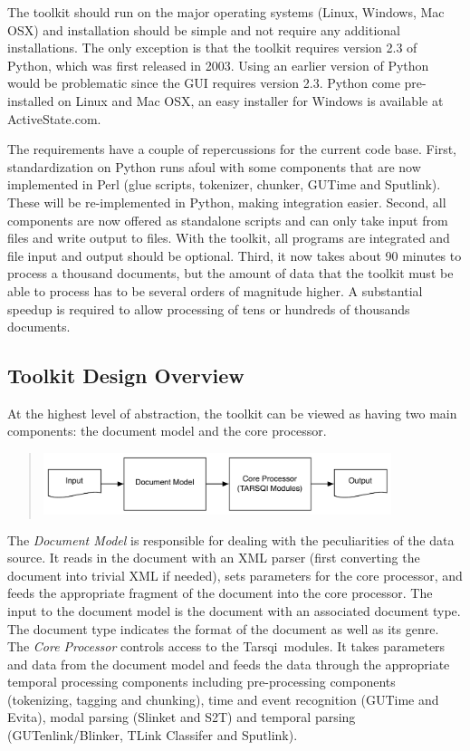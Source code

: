 \documentclass[11pt]{article}
\newcommand{\tarsqi}{T{\sc arsqi}}
\begin{document}
The toolkit should run on the major operating systems (Linux, Windows, Mac OSX) and installation should be simple and not require any additional installations. The only exception is that the toolkit requires version 2.3 of Python, which was first released in 2003. Using an earlier version of Python would be problematic since the GUI requires version 2.3. Python come pre-installed on Linux and Mac OSX, an easy installer for Windows is available at ActiveState.com.

The requirements have a couple of repercussions for the current code base. First, standardization on Python runs afoul with some components that are now implemented in Perl (glue scripts, tokenizer, chunker, GUTime and Sputlink). These will be re-implemented in Python, making integration easier. Second, all components are now offered as standalone scripts and can only take input from files and write output to files. With the toolkit, all programs are integrated and file input and output should be optional. Third, it now takes about 90 minutes to process a thousand documents, but the amount of data that the toolkit must be able to process has to be several orders of magnitude higher. A substantial speedup is required to allow processing of tens or hundreds of thousands documents.


\subsection{Toolkit Design Overview}

At the highest level of abstraction, the toolkit can be viewed as having two main components: the document model and the core processor.

\begin{quote}
\includegraphics[width=4in]{images/architecture1.pdf} 
\end{quote}

The {\em Document Model} is responsible for dealing with the peculiarities of the data source. It reads in the document with an XML parser (first converting the document into trivial XML if needed), sets parameters for the core processor, and feeds the appropriate fragment of the document into the core processor. The input to the document model is the document with an associated document type. The document type indicates the format of the document as well as its genre. The {\em Core Processor} controls access to the \tarsqi\ modules. It takes parameters and data from the document model and feeds the data through the appropriate temporal processing components including pre-processing components (tokenizing, tagging and chunking), time and event recognition (GUTime and Evita), modal parsing (Slinket and S2T) and temporal parsing (GUTenlink/Blinker, TLink Classifer and Sputlink).
\end{document}
